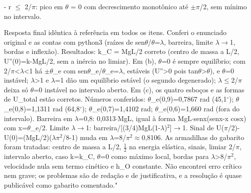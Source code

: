 \documentclass{article}%
\begin{document}
{-} r $\leq$ 2/$\pi$: pico em $\theta$ = 0 com decrescimento monotônico até $\pm$$\pi$/2, sem mínimo no intervalo.\par %
Resposta final idêntica à referência em todos os itens. Conferi o enunciado original e as contas com python3 (raízes de sen$\theta$/$\theta$=$\lambda$, barreira, limite $\lambda$$\to$1, bordas e inflexão). Resultados: k\_C = MgL/2 correto (centro de massa a L/2, U''(0)=k-MgL/2, sem a inércia no limiar). Em (b), $\theta$=0 é sempre equilíbrio; com 2/$\pi$<$\lambda$<1 há $\pm$$\theta$\_e com sen$\theta$\_e/$\theta$\_e=$\lambda$, estáveis (U''>0 pois tan$\theta$>$\theta$), e $\theta$=0 instável; $\lambda$>1 e $\lambda$=1 dão um equilíbrio estável (o segundo degenerado); $\lambda$$\leq$2/$\pi$ deixa só $\theta$=0 instável no intervalo aberto. Em (c), os quatro esboços e as formas de U\_total estão corretos. Números conferidos: $\theta$\_e(0,9)=0,7867 rad (45,1$^\circ$); $\theta$\_e(0,8)=1,1311 rad (64,8$^\circ$); $\theta$\_e(0,7)=1,4102 rad; $\theta$\_e(0,6)=1,660 rad (fora do intervalo). Barreira em $\lambda$=0,8: 0,0313$\cdot$MgL, igual à forma MgL$\cdot$senx(senx-x cosx) com x=$\theta$\_e/2. Limite $\lambda$$\to$1: barreira/{[}(3/4)MgL(1-$\lambda$)$^2${]}$\to$1. Sinal de U($\pi$/2)-U(0)=(MgL/2)($\lambda$$\pi$$^2$/8-1) muda em $\lambda$=8/$\pi$$^2$$\approx$0,8106. As armadilhas do gabarito foram tratadas: centro de massa a L/2, $\frac12$ na energia elástica, sinais, limiar 2/$\pi$, intervalo aberto, caso k=k\_C, $\theta$=0 como máximo local, bordas para $\lambda$>8/$\pi$$^2$, velocidade nula sem termo cinético e h\_O constante. Não encontrei erro crítico nem grave; os problemas são de redação e de justificativa, e a resolução é quase publicável como gabarito comentado."%
\end{document}
